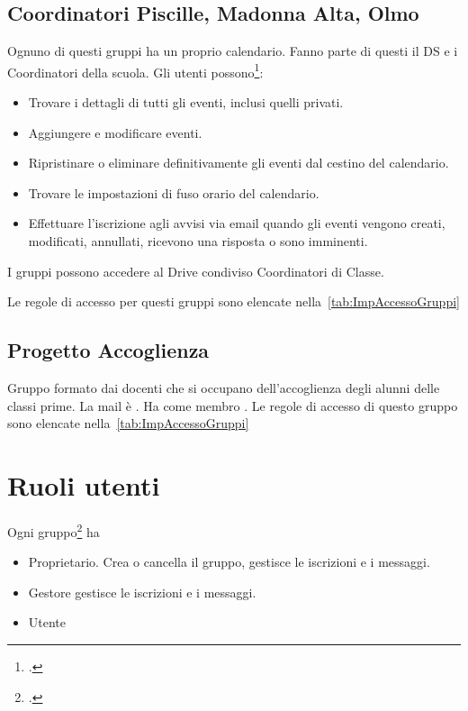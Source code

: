 \subsection{Coordinatori Piscille, Madonna Alta, Olmo}
Ognuno di questi gruppi ha un proprio calendario. Fanno parte di questi il DS e i Coordinatori della scuola. Gli utenti possono\footcite{Google2023g}:
\begin{itemize}
	\item Trovare i dettagli di tutti gli eventi, inclusi quelli privati.
	\item Aggiungere e modificare eventi.
	\item Ripristinare o eliminare definitivamente gli eventi dal cestino del calendario.
	\item Trovare le impostazioni di fuso orario del calendario.
	\item Effettuare l'iscrizione agli avvisi via email quando gli eventi vengono creati, modificati, annullati, ricevono una risposta o sono imminenti.
\end{itemize}

I gruppi possono accedere al Drive condiviso Coordinatori di Classe.

Le  regole di accesso per questi gruppi sono elencate nella~\cref{tab:ImpAccessoGruppi}
\subsection{Progetto Accoglienza}
Gruppo formato dai docenti che si occupano dell'accoglienza degli alunni delle classi prime. La mail è . Ha come membro .  Le  regole di accesso di questo gruppo sono elencate nella~\cref{tab:ImpAccessoGruppi}
\section{Ruoli utenti}
Ogni gruppo\footcite{Google2023e} ha 
\begin{itemize}
	\item Proprietario. Crea o cancella il gruppo, gestisce le iscrizioni e i messaggi. 
	\item Gestore gestisce le iscrizioni e i messaggi. 
	\item Utente
\end{itemize}
